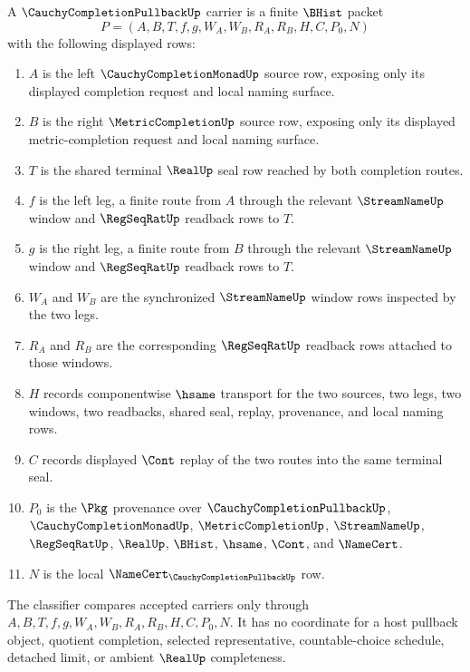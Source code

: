 \begin{definition}
\label{def:cauchy-completion-pullback-carrier}
A $\CauchyCompletionPullbackUp$ carrier is a finite $\BHist$ packet
$$
P=(A,B,T,f,g,W_A,W_B,R_A,R_B,H,C,P_0,N)
$$
with the following displayed rows:
\begin{enumerate}
\item $A$ is the left $\CauchyCompletionMonadUp$ source row, exposing only its displayed completion request and local naming surface.
\item $B$ is the right $\MetricCompletionUp$ source row, exposing only its displayed metric-completion request and local naming surface.
\item $T$ is the shared terminal $\RealUp$ seal row reached by both completion routes.
\item $f$ is the left leg, a finite route from $A$ through the relevant $\StreamNameUp$ window and $\RegSeqRatUp$ readback rows to $T$.
\item $g$ is the right leg, a finite route from $B$ through the relevant $\StreamNameUp$ window and $\RegSeqRatUp$ readback rows to $T$.
\item $W_A$ and $W_B$ are the synchronized $\StreamNameUp$ window rows inspected by the two legs.
\item $R_A$ and $R_B$ are the corresponding $\RegSeqRatUp$ readback rows attached to those windows.
\item $H$ records componentwise $\hsame$ transport for the two sources, two legs, two windows, two readbacks, shared seal, replay, provenance, and local naming rows.
\item $C$ records displayed $\Cont$ replay of the two routes into the same terminal seal.
\item $P_0$ is the $\Pkg$ provenance over $\CauchyCompletionPullbackUp$, $\CauchyCompletionMonadUp$, $\MetricCompletionUp$, $\StreamNameUp$, $\RegSeqRatUp$, $\RealUp$, $\BHist$, $\hsame$, $\Cont$, and $\NameCert$.
\item $N$ is the local $\NameCert_{\CauchyCompletionPullbackUp}$ row.
\end{enumerate}
The classifier compares accepted carriers only through $A,B,T,f,g,W_A,W_B,R_A,R_B,H,C,P_0,N$. It has no coordinate for a host pullback object, quotient completion, selected representative, countable-choice schedule, detached limit, or ambient $\RealUp$ completeness.
\end{definition}

